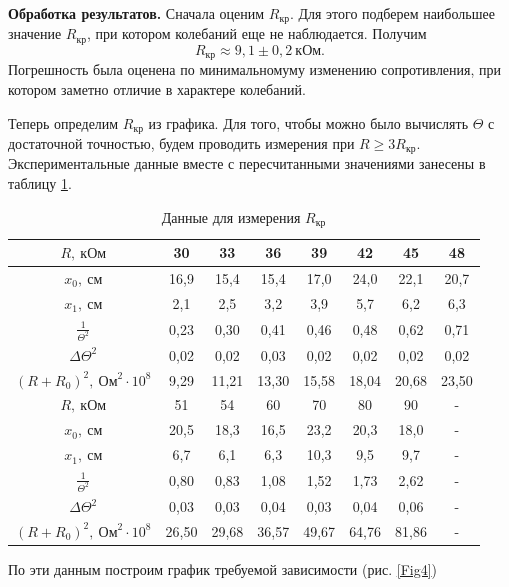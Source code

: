 \documentclass[12pt,a4paper]{article}
\begin{document}
\textbf{Обработка результатов.} Сначала оценим $R_\text{кр}$. Для этого подберем наибольшее значение $R_\text{кр}$, при котором колебаний еще не наблюдается. Получим
\begin{equation}
R_\text{кр} \approx 9,1 \pm 0,2~\text{кОм}.
\end{equation}
Погрешность была оценена по минимальномуму изменению сопротивления, при котором заметно отличие в характере колебаний.

Теперь определим $R_\text{кр}$ из графика. Для того, чтобы можно было вычислять $\Theta$ с достаточной точностью, будем проводить измерения при $R \geq 3R_\text{кр}$. Экспериментальные данные вместе с пересчитанными значениями занесены в таблицу \ref{tab2}.
\begin{table}[ht]\centering
\begin{tabular}{|*{8}{c|}}
\hline
$R,~\text{кОм}$&30&33&36&39&42&45&48\\
\hline
$x_0,~\text{см}$&16,9&15,4&15,4&17,0&24,0&22,1&20,7\\
\hline
$x_1,~\text{см}$&2,1&2,5&3,2&3,9&5,7&6,2&6,3\\
\hline
$\frac{1}{\Theta^2}$&0,23&0,30&0,41&0,46&0,48&0,62&0,71\\
\hline
$\Delta\Theta^2$&0,02&0,02&0,03&0,02&0,02&0,02&0,02\\
\hline
$\left(R+R_0\right)^2,~\text{Ом}^2\cdot10^8$&9,29&11,21&13,30&15,58&18,04&20,68&23,50\\
\hline
$R,~\text{кОм}$&51&54&60&70&80&90&-\\
\hline
$x_0,~\text{см}$&20,5&18,3&16,5&23,2&20,3&18,0&-\\
\hline
$x_1,~\text{см}$&6,7&6,1&6,3&10,3&9,5&9,7&-\\
\hline
$\frac{1}{\Theta^2}$&0,80&0,83&1,08&1,52&1,73&2,62&-\\
\hline
$\Delta\Theta^2$&0,03&0,03&0,04&0,03&0,04&0,06&-\\
\hline
$\left(R+R_0\right)^2,~\text{Ом}^2\cdot10^8$&26,50&29,68&36,57&49,67&64,76&81,86&-\\
\hline
\end{tabular}
\caption{Данные для измерения $R_\text{кр}$ \label{tab2}}
\end{table}
По эти данным построим график требуемой зависимости (рис. \ref{Fig4})
\medskip
\end{document}
